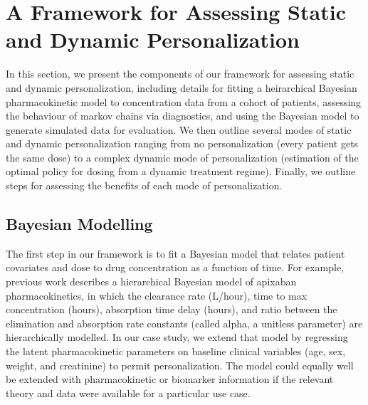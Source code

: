\section{A Framework for Assessing Static and Dynamic Personalization}\label{ss:framework}

In this section, we present the components of our framework for assessing static and dynamic personalization, including details for fitting a heirarchical Bayesian pharmacokinetic model to concentration data from a cohort of patients, assessing the behaviour of markov chains via diagnostics, and using the Bayesian model to generate simulated data for evaluation. We then outline several modes of static and dynamic personalization ranging from no personalization (every patient gets the same dose) to a complex dynamic mode of personalization (estimation of the optimal policy for dosing from a dynamic treatment regime).  Finally, we outline steps for assessing the benefits of each mode of personalization.

\subsection{Bayesian Modelling}

The first step in our framework is to fit a Bayesian model that relates patient covariates and dose to drug concentration as a function of time. For example, previous work \cite{pananos2020comparisons} describes a hierarchical Bayesian model of apixaban pharmacokinetics, in which the clearance rate (L/hour), time to max concentration (hours), absorption time delay (hours), and ratio between the elimination and absorption rate constants (called alpha, a unitless parameter) are hierarchically modelled. In our case study, we extend that model by regressing the latent pharmacokinetic parameters on baseline clinical variables (age, sex, weight, and creatinine) to permit personalization. The model could equally well be extended with pharmacokinetic or biomarker information if the relevant theory and data were available for a particular use case.

